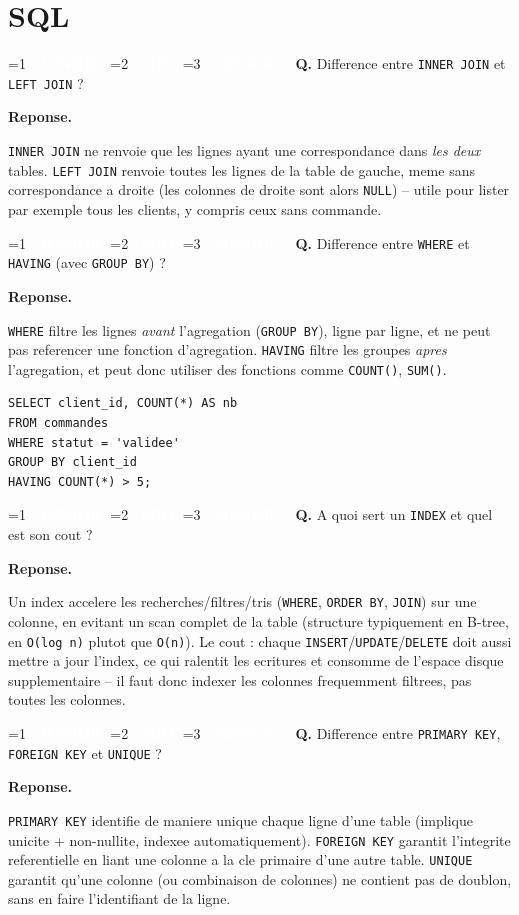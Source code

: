 \documentclass[11pt,a4paper]{article}
\newcommand{\badgeJ}{\textcolor{white}{\colorbox{junior}{\small\bfseries\ JUNIOR\ }}}
\newcommand{\badgeM}{\textcolor{white}{\colorbox{mid}{\small\bfseries\ MID\ }}}
\newcommand{\badgeS}{\textcolor{white}{\colorbox{senior}{\small\bfseries\ SENIOR\ }}}
\newcounter{qcount}
\newenvironment{qa}[2]{%
  \stepcounter{qcount}%
  \par\vspace{6pt}%
  \noindent\colorbox{qbg}{\parbox{\dimexpr\linewidth-12pt}{\vspace{2pt}%
  \ifnum#1=1 \badgeJ\fi\ifnum#1=2 \badgeM\fi\ifnum#1=3 \badgeS\fi
  \ \textbf{Q\theqcount.} #2\vspace{2pt}}}\par\vspace{4pt}%
  \noindent\textbf{\color{accent}Reponse.}\ \ignorespaces
}{%
  \par\vspace{8pt}%
}
\begin{document}
\newpage
\section{SQL}

\begin{qa}{1}{Difference entre \texttt{INNER JOIN} et \texttt{LEFT JOIN} ?}
\texttt{INNER JOIN} ne renvoie que les lignes ayant une correspondance dans
\emph{les deux} tables. \texttt{LEFT JOIN} renvoie toutes les lignes de la
table de gauche, meme sans correspondance a droite (les colonnes de droite
sont alors \texttt{NULL}) -- utile pour lister par exemple tous les clients,
y compris ceux sans commande.
\end{qa}

\begin{qa}{1}{Difference entre \texttt{WHERE} et \texttt{HAVING} (avec \texttt{GROUP BY}) ?}
\texttt{WHERE} filtre les lignes \emph{avant} l'agregation (\texttt{GROUP BY}),
ligne par ligne, et ne peut pas referencer une fonction d'agregation.
\texttt{HAVING} filtre les groupes \emph{apres} l'agregation, et peut donc
utiliser des fonctions comme \texttt{COUNT()}, \texttt{SUM()}.
\begin{lstlisting}
SELECT client_id, COUNT(*) AS nb
FROM commandes
WHERE statut = 'validee'
GROUP BY client_id
HAVING COUNT(*) > 5;
\end{lstlisting}
\end{qa}

\begin{qa}{2}{A quoi sert un \texttt{INDEX} et quel est son cout ?}
Un index accelere les recherches/filtres/tris (\texttt{WHERE},
\texttt{ORDER BY}, \texttt{JOIN}) sur une colonne, en evitant un scan complet
de la table (structure typiquement en B-tree, en \texttt{O(log n)} plutot que
\texttt{O(n)}). Le cout : chaque \texttt{INSERT}/\texttt{UPDATE}/\texttt{DELETE}
doit aussi mettre a jour l'index, ce qui ralentit les ecritures et consomme de
l'espace disque supplementaire -- il faut donc indexer les colonnes
frequemment filtrees, pas toutes les colonnes.
\end{qa}

\begin{qa}{1}{Difference entre \texttt{PRIMARY KEY}, \texttt{FOREIGN KEY} et \texttt{UNIQUE} ?}
\texttt{PRIMARY KEY} identifie de maniere unique chaque ligne d'une table
(implique unicite + non-nullite, indexee automatiquement).
\texttt{FOREIGN KEY} garantit l'integrite referentielle en liant une colonne
a la cle primaire d'une autre table. \texttt{UNIQUE} garantit qu'une colonne
(ou combinaison de colonnes) ne contient pas de doublon, sans en faire
l'identifiant de la ligne.
\end{qa}
\end{document}
